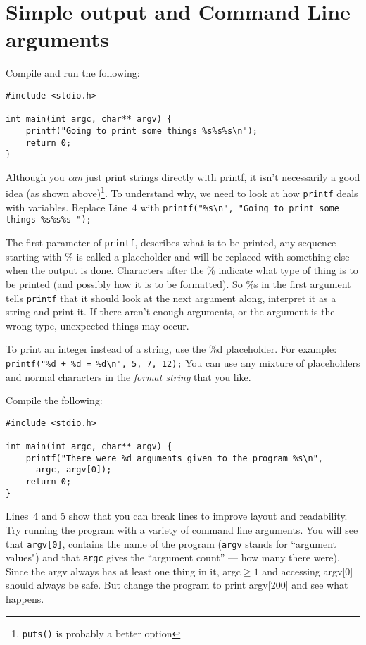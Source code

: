 
\chapter{Simple output and Command Line arguments}


Compile and run the following:
\begin{lstlisting}
#include <stdio.h>

int main(int argc, char** argv) {
    printf("Going to print some things %s%s%s\n");
    return 0;
}
\end{lstlisting}

Although you \emph{can} just print strings directly with printf, it isn't necessarily a good idea (as shown above)\footnote{\texttt{puts()} is probably a better option}.
To understand why, we need to look at how \texttt{printf} deals with variables.
Replace Line~$4$ with \lstinline!printf("%s\n", "Going to print some things %s%s%s ");!

The first parameter of \texttt{printf}, describes what is to be printed, any sequence starting with \% is called a placeholder and will be replaced with something else when the output is done.
Characters after the \% indicate what type of thing is to be printed (and possibly how it is to be formatted).
So \%s in the first argument tells \texttt{printf} that it should look at the next argument along, interpret it as a string and print it.
If there aren't enough arguments, or the argument is the wrong type, unexpected things may occur.

To print an integer instead of a string, use the \%d placeholder.
For example: \lstinline!printf("%d + %d = %d\n", 5, 7, 12);!
You can use any mixture of placeholders and normal characters in the \emph{format string} that you like.


Compile the following:
\begin{lstlisting}
#include <stdio.h>

int main(int argc, char** argv) {
    printf("There were %d arguments given to the program %s\n",
      argc, argv[0]);
    return 0;
}
\end{lstlisting}
Lines~4 and 5 show that you can break lines to improve layout and readability.
Try running the program with a variety of command line arguments.
You will see that \texttt{argv[0]}, contains the name of the program (\texttt{argv} stands for ``argument values") and that \texttt{argc} gives the ``argument count'' --- how many there were).
Since the argv always has at least one thing in it, argc$\geq 1$ and accessing argv[0] should always be safe.
But change the program to print argv[200] and see what happens.


